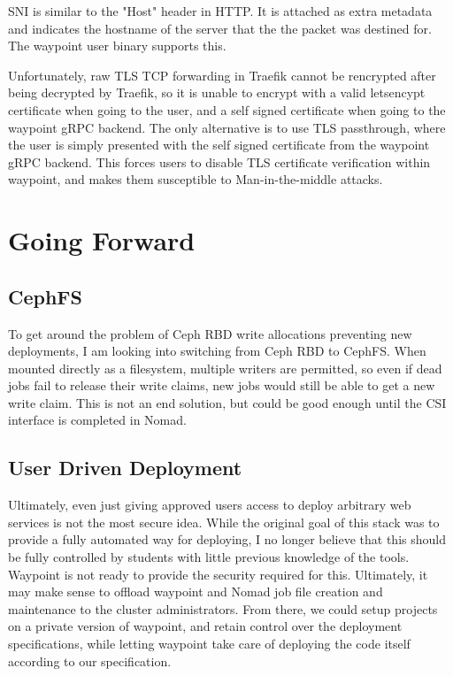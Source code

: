 \documentclass{article}
\begin{document}
SNI is similar to the "Host" header in HTTP. It is attached as extra metadata and indicates the hostname of the server that the the packet was destined for. The waypoint user binary supports this. 

Unfortunately, raw TLS TCP forwarding in Traefik cannot be rencrypted after being decrypted by Traefik, so it is unable to encrypt with a valid letsencypt certificate when going to the user, and a self signed certificate when going to the waypoint gRPC backend. The only alternative is to use TLS passthrough, where the user is simply presented with the self signed certificate from the waypoint gRPC backend. This forces users to disable TLS certificate verification within waypoint, and makes them susceptible to Man-in-the-middle attacks.

\section{Going Forward}
\subsection{CephFS}
To get around the problem of Ceph RBD write allocations preventing new deployments, I am looking into switching from Ceph RBD to CephFS. When mounted directly as a filesystem, multiple writers are permitted, so even if dead jobs fail to release their write claims, new jobs would still be able to get a new write claim. This is not an end solution, but could be good enough until the CSI interface is completed in Nomad.

\subsection{User Driven Deployment}
Ultimately, even just giving approved users access to deploy arbitrary web services is not the most secure idea. While the original goal of this stack was to provide a fully automated way for deploying, I no longer believe that this should be fully controlled by students with little previous knowledge of the tools. Waypoint is not ready to provide the security required for this. Ultimately, it may make sense to offload waypoint and Nomad job file creation and maintenance to the cluster administrators. From there, we could setup projects on a private version of waypoint, and retain control over the deployment specifications, while letting waypoint take care of deploying the code itself according to our specification.
\end{document}
